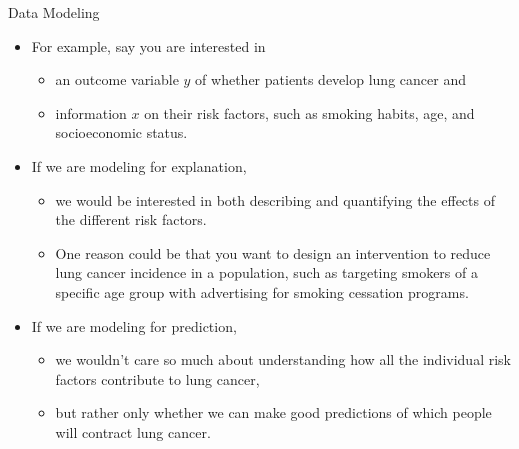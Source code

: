 \documentclass[
  ignorenonframetext,
]{beamer}
\providecommand{\tightlist}{%
  \setlength{\itemsep}{0pt}\setlength{\parskip}{0pt}}
\begin{document}
\begin{frame}{Data Modeling}
\protect\hypertarget{data-modeling-1}{}
\begin{itemize}
\item
  For example, say you are interested in

  \begin{itemize}
  \tightlist
  \item
    an outcome variable \(y\) of whether patients develop lung cancer
    and
  \item
    information \(x\) on their risk factors, such as smoking habits,
    age, and socioeconomic status.
  \end{itemize}
\item
  If we are modeling for explanation,

  \begin{itemize}
  \tightlist
  \item
    we would be interested in both describing and quantifying the
    effects of the different risk factors.
  \item
    One reason could be that you want to design an intervention to
    reduce lung cancer incidence in a population, such as targeting
    smokers of a specific age group with advertising for smoking
    cessation programs.
  \end{itemize}
\item
  If we are modeling for prediction,

  \begin{itemize}
  \tightlist
  \item
    we wouldn't care so much about understanding how all the individual
    risk factors contribute to lung cancer,
  \item
    but rather only whether we can make good predictions of which people
    will contract lung cancer.
  \end{itemize}
\end{itemize}
\end{frame}
\end{document}
